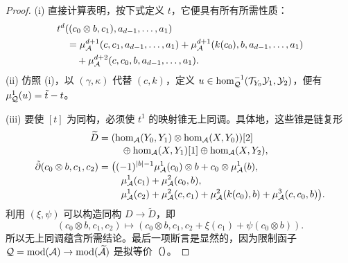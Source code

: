 \begin{proof}
(i) 直接计算表明，按下式定义 $t$，它便具有所有所需性质：
\[
\begin{aligned}
&t^d((c_0\otimes b,c_1),a_{d-1},\ldots,a_1)\\
&\quad=\mu^{d+1}_{\mathcal A}(c,c_1,a_{d-1},\ldots,a_1)+\mu^{d+1}_{\mathcal A}(k(c_0),b,a_{d-1},\ldots,a_1)\\
&\qquad+\mu^{d+2}_{\mathcal A}(c,c_0,b,a_{d-1},\ldots,a_1).
\end{aligned}
\]
(ii) 仿照 (i)，以 $(\gamma,\kappa)$ 代替 $(c,k)$，定义 $u\in\hom^{-1}_{\mathcal Q}(\mathcal T_{Y_0}\mathcal Y_1,\mathcal Y_2)$，便有 $\mu^1_{\mathcal Q}(u)=\tilde t-t$。

(iii) 要使 $[t]$ 为同构，必须使 $t^1$ 的映射锥无上同调。具体地，这些锥是链复形
\[
\begin{aligned}
\widetilde D={}&(\hom_{\mathcal A}(Y_0,Y_1)\otimes\hom_{\mathcal A}(X,Y_0))[2]\\[-2pt]
&\quad\oplus\hom_{\mathcal A}(X,Y_1)[1]\oplus\hom_{\mathcal A}(X,Y_2),\\
\tilde\partial(c_0\otimes b,c_1,c_2)={}&\bigl((-1)^{|b|-1}\mu^1_{\mathcal A}(c_0)\otimes b+c_0\otimes\mu^1_{\mathcal A}(b),\\[-2pt]
&\quad\mu^1_{\mathcal A}(c_1)+\mu^2_{\mathcal A}(c_0,b),\\[-2pt]
&\quad\mu^1_{\mathcal A}(c_2)+\mu^2_{\mathcal A}(c,c_1)+\mu^2_{\mathcal A}(k(c_0),b)+\mu^3_{\mathcal A}(c,c_0,b)\bigr).
\end{aligned}
\]
利用 $(\xi,\psi)$ 可以构造同构 $D\to\widetilde D$，即
\[
(c_0\otimes b,c_1,c_2)\longmapsto(c_0\otimes b,c_1,c_2+\xi(c_1)+\psi(c_0\otimes b)).
\]
所以无上同调蕴含所需结论。最后一项断言是显然的，因为限制函子 $\mathcal Q=\operatorname{mod}(\mathcal A)\to\operatorname{mod}(\widetilde{\mathcal A})$ 是拟等价（）。
\end{proof}

